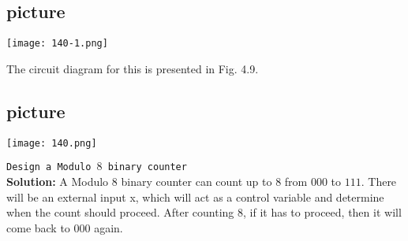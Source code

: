 \documentclass[9pt]{beamer}
\begin{document}
\begin{frame}
\begin{center}
\section{picture}
\texttt{[image: 140-1.png]}
\end{center}

The circuit diagram for this is presented in Fig. 4.9.
\end{frame}

\begin{frame}
\begin{center}
\section{picture}
\texttt{[image: 140.png]}
\end{center}

\hspace*{0.1cm} \texttt{Design a Modulo $8$ binary counter}\\

\textbf{Solution:} A Modulo $8$ binary counter can count up to $8$ from $000$ to $111$. There will be an external input x,
which will act as a control variable and determine when the count should proceed. After counting $8$, if it
has to proceed, then it will come back to $000$ again.
\end{frame}
\end{document}
